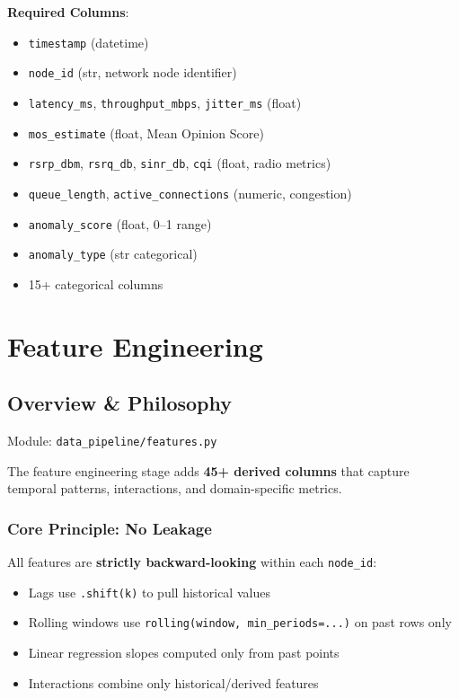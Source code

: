 \documentclass[11pt,a4paper,oneside]{report}
\begin{document}
\textbf{Required Columns}:
\begin{itemize}
    \item \texttt{timestamp} (datetime)
    \item \texttt{node\_id} (str, network node identifier)
    \item \texttt{latency\_ms}, \texttt{throughput\_mbps}, \texttt{jitter\_ms} (float)
    \item \texttt{mos\_estimate} (float, Mean Opinion Score)
    \item \texttt{rsrp\_dbm}, \texttt{rsrq\_db}, \texttt{sinr\_db}, \texttt{cqi} (float, radio metrics)
    \item \texttt{queue\_length}, \texttt{active\_connections} (numeric, congestion)
    \item \texttt{anomaly\_score} (float, 0--1 range)
    \item \texttt{anomaly\_type} (str categorical)
    \item 15+ categorical columns
\end{itemize}
\newpage
\chapter{Feature Engineering}

\section{Overview \& Philosophy}

Module: \texttt{data\_pipeline/features.py}

The feature engineering stage adds \textbf{45+ derived columns} that capture temporal patterns, interactions, and domain-specific metrics.

\subsection{Core Principle: No Leakage}

All features are \textbf{strictly backward-looking} within each \texttt{node\_id}:
\begin{itemize}
    \item Lags use \texttt{.shift(k)} to pull historical values
    \item Rolling windows use \texttt{rolling(window, min\_periods=...)} on past rows only
    \item Linear regression slopes computed only from past points
    \item Interactions combine only historical/derived features
\end{itemize}
\end{document}
